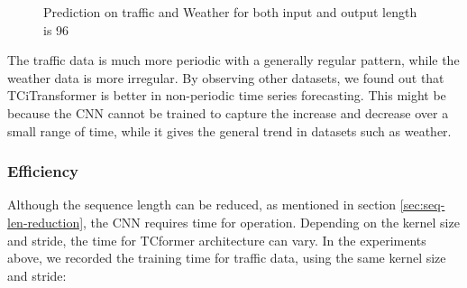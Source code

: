 \documentclass[stu,12pt,floatsintext]{apa7}
\begin{document}
\begin{figure}[H]
    \centering
    \hfill
    \caption{Prediction on traffic and Weather for both input and output length is 96}
    \label{fig:TCiTrans-compare}
\end{figure}

The traffic data is much more periodic with a generally regular pattern, while the weather data is more irregular. By observing other datasets, we found out that TCiTransformer is better in non-periodic time series forecasting. This might be because the CNN cannot be trained to capture the increase and decrease over a small range of time, while it gives the general trend in datasets such as weather.

\subsubsection{Efficiency}
Although the sequence length can be reduced, as mentioned in section \ref{sec:seq-len-reduction}, the CNN requires time for operation. Depending on the kernel size and stride, the time for TCformer architecture can vary. In the experiments above, we recorded the training time for traffic data, using the same kernel size and stride: 
\end{document}
